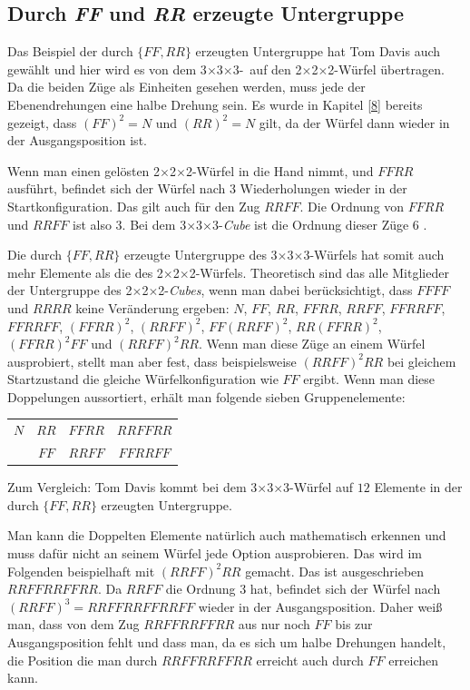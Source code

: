 \documentclass[12pt,a4paper, usenames, dvipsnames]{article}
\newcommand{\Ttwo}{2$\times$2$\times$2-}
\newcommand{\Tthree}{3$\times$3$\times$3-}
\begin{document}
\subsection*{Durch \textit{FF} und \textit{RR} erzeugte Untergruppe}

Das Beispiel der durch $\{ FF, RR \}$ erzeugten Untergruppe hat Tom Davis auch gewählt \cite{TD} und hier wird es von dem \Tthree \ auf den \Ttwo Würfel übertragen.
Da die beiden Züge als Einheiten gesehen werden, muss jede der Ebenendrehungen eine halbe Drehung sein.
Es wurde in Kapitel \ref{8} bereits gezeigt, dass $(FF)^2 = N$ und $(RR)^2 = N$ gilt, da der Würfel dann wieder in der Ausgangsposition ist.

Wenn man einen gelösten \Ttwo Würfel in die Hand nimmt, und $FFRR$ ausführt, befindet sich der Würfel nach 3 Wiederholungen wieder in der Startkonfiguration. Das gilt auch für den Zug $RRFF$. Die Ordnung von $FFRR$ und $RRFF$ ist also 3. Bei dem \Tthree \textit{Cube} ist die Ordnung dieser Züge 6 \cite{TD}.

Die durch $\{ FF, RR \}$ erzeugte Untergruppe des \Tthree Würfels hat somit auch mehr Elemente als die des \Ttwo Würfels. Theoretisch sind das alle Mitglieder der Untergruppe des \Ttwo \textit{Cubes}, wenn man dabei berücksichtigt, dass $FFFF$ und $RRRR$ keine Veränderung ergeben: $N$, $FF$, $RR$, $FFRR$, $RRFF$, $FFRRFF$, $FFRRFF$, $(FFRR)^2$, $(RRFF)^2$, $FF(RRFF)^2$, $RR(FFRR)^2$, $(FFRR)^2FF$ und $(RRFF)^2RR$. 
Wenn man diese Züge an einem Würfel ausprobiert, stellt man aber fest, dass beispielsweise $(RRFF)^2RR$ bei gleichem Startzustand die gleiche Würfelkonfiguration wie $FF$ ergibt. Wenn man diese Doppelungen aussortiert, erhält man folgende sieben Gruppenelemente:
\begin{center}
\centering
\begin{tabular}{c c c c}
$N$ & $RR$ & $FFRR$ &  $RRFFRR$ \\
& $FF$ & $RRFF$ & $FFRRFF$   \\
\end{tabular}
\end{center}
Zum Vergleich: Tom Davis kommt bei dem  \Tthree Würfel auf $12$ Elemente in der durch $\{ FF, RR \}$ erzeugten Untergruppe.

Man kann die Doppelten Elemente natürlich auch mathematisch erkennen und muss dafür nicht an seinem Würfel jede Option ausprobieren.
Das wird im Folgenden beispielhaft mit $(RRFF)^2RR$ gemacht. Das ist ausgeschrieben $RRFFRRFFRR$. Da $RRFF$ die Ordnung 3 hat, befindet sich der Würfel nach $(RRFF)^3 = RRFFRRFFRRFF$ wieder in der Ausgangsposition. Daher weiß man, dass von dem Zug $RRFFRRFFRR$ aus nur noch $FF$ bis zur Ausgangsposition fehlt und dass man, da es sich um halbe Drehungen handelt, die Position die man durch $RRFFRRFFRR$ erreicht auch durch $FF$ erreichen kann.
\end{document}
